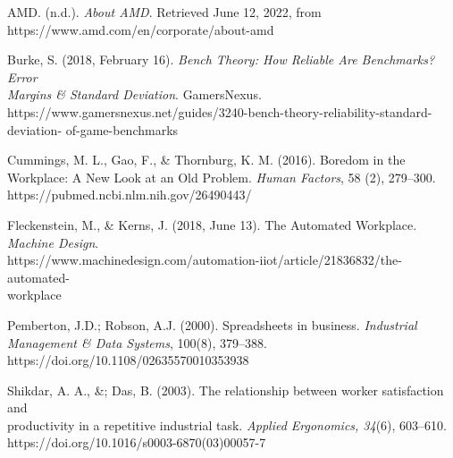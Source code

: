 \documentclass[12pt]{article}
\begin{document}



AMD. (n.d.). \emph{About AMD}. Retrieved June 12, 2022, from \\
\indent\hspace{0.5in} https://www.amd.com/en/corporate/about-amd 

Burke, S. (2018, February 16). \emph{Bench Theory: How Reliable Are Benchmarks? Error \\
\indent\hspace{0.5in} Margins \& Standard Deviation}. GamersNexus. \\
\indent\hspace{0.5in} https://www.gamersnexus.net/guides/3240-bench-theory-reliability-standard-deviation-
\indent\hspace{0.5in} of-game-benchmarks

Cummings, M. L., Gao, F., \& Thornburg, K. M. (2016). Boredom in the Workplace: A New 
\indent\hspace{0.5in} Look at an Old Problem. \emph{Human Factors}, 58 (2), 279–300. \\
\indent\hspace{0.5in} https://pubmed.ncbi.nlm.nih.gov/26490443/

Fleckenstein, M., \& Kerns, J. (2018, June 13). The Automated Workplace. \emph{Machine Design}. \\
\indent\hspace{0.5in} https://www.machinedesign.com/automation-iiot/article/21836832/the-automated-\\
\indent\hspace{0.5in} workplace


Pemberton, J.D.; Robson, A.J. (2000). Spreadsheets in business. \emph{Industrial Management \& \indent\hspace{0.5in}  Data Systems}, 100(8), 379–388. \\ 
\indent\hspace{0.5in}  https://doi.org/10.1108/02635570010353938 

Shikdar, A. A., \&; Das, B. (2003). The relationship between worker satisfaction and \\
\indent\hspace{0.5in} productivity in a repetitive industrial task. \emph{Applied Ergonomics, 34}(6), 603–610. \\ 
\indent\hspace{0.5in} https://doi.org/10.1016/s0003-6870(03)00057-7 
\end{document}
